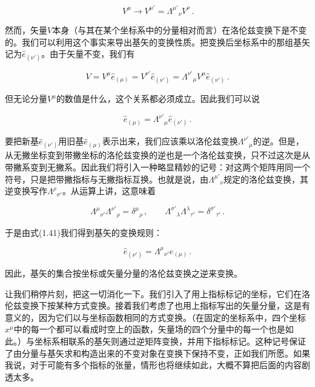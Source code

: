 \begin{equation*}
\boxed{\,V^{\mu}\rightarrow V^{\mu'}=\Lambda^{\mu'}{}_{\nu}V^{\nu}\,.}
\tag{1.39}
\end{equation*}

然而，矢量$V$本身（与其在某个坐标系中的分量相对而言）在洛伦兹变换下是不变的。我们可以利用这个事实来导出基矢的变换性质。把变换后坐标系中的那组基矢记为$\hat{e}_{(\nu')}$。由于矢量不变，我们有

\begin{equation*}
V=V^{\mu}\hat{e}_{(\mu)}=V^{\nu'}\hat{e}_{(\nu')}
=\Lambda^{\nu'}{}_{\mu}V^{\mu}\hat{e}_{(\nu')}\,.
\tag{1.40}
\end{equation*}

但无论分量$V^{\mu}$的数值是什么，这个关系都必须成立。因此我们可以说

\begin{equation*}
\hat{e}_{(\mu)}=\Lambda^{\nu'}{}_{\mu}\hat{e}_{(\nu')}\,.
\tag{1.41}
\end{equation*}

要把新基$\hat{e}_{(\nu')}$用旧基$\hat{e}_{(\mu)}$表示出来，我们应该乘以洛伦兹变换$\Lambda^{\nu'}{}_{\mu}$的逆。但是，从无撇坐标变到带撇坐标的洛伦兹变换的逆也是一个洛伦兹变换，只不过这次是从带撇系变到无撇系。因此我们将引入一种略显精妙的记号：对这两个矩阵用同一个符号，只是把带撇指标与无撇指标互换。也就是说，由$\Lambda^{\mu'}{}_{\nu}$规定的洛伦兹变换，其逆变换写作$\Lambda^{\rho}{}_{\sigma'}$。从运算上讲，这意味着

\begin{equation*}
\Lambda^{\mu}{}_{\nu'}\Lambda^{\nu'}{}_{\rho}=\delta^{\mu}{}_{\rho}\,,\qquad
\Lambda^{\sigma'}{}_{\lambda}\Lambda^{\lambda}{}_{\tau'}=\delta^{\sigma'}{}_{\tau'}\,.
\tag{1.42}
\end{equation*}

于是由式(1.41)我们得到基矢的变换规则：

\begin{equation*}
\hat{e}_{(\nu')}=\Lambda^{\mu}{}_{\nu'}\hat{e}_{(\mu)}\,.
\tag{1.43}
\end{equation*}

因此，基矢的集合按坐标或矢量分量的洛伦兹变换之逆来变换。

让我们稍停片刻，把这一切消化一下。我们引入了用上指标标记的坐标，它们在洛伦兹变换下按某种方式变换。接着我们考虑了也用上指标写出的矢量分量，这是有意义的，因为它们以与坐标函数相同的方式变换。（在固定的坐标系中，四个坐标$x^{\mu}$中的每一个都可以看成时空上的函数，矢量场的四个分量中的每一个也是如此。）与坐标系相联系的基矢则通过逆矩阵变换，并用下指标标记。这种记号保证了由分量与基矢求和构造出来的不变对象在变换下保持不变，正如我们所愿。如果我说，对于可能有多个指标的张量，情形也将继续如此，大概不算把后面的内容剧透太多。

